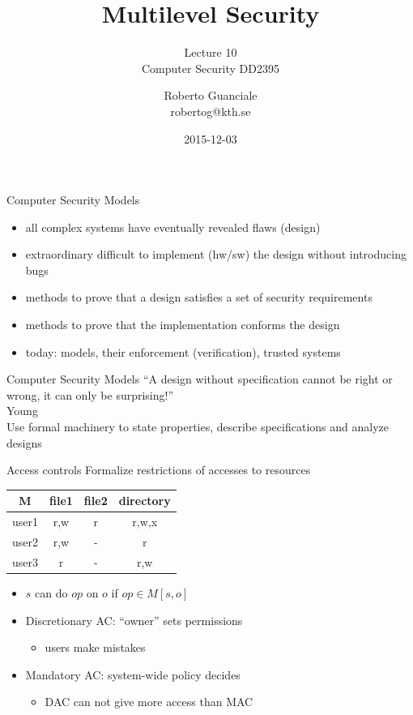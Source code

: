 \documentclass{beamer}
\title{Multilevel Security}
\subtitle{Lecture 10 \\ Computer Security DD2395}
\author[R. Guanciale]{
  Roberto Guanciale\\
  robertog@kth.se
}
\date{2015-12-03}
\begin{document}
\begin{frame}[plain]
  \titlepage
\end{frame}

\begin{frame}{Computer Security Models}
  \begin{itemize}
  \item all complex systems have eventually revealed flaws (design)
  \item extraordinary difficult to implement (hw/sw) the design
    without introducing bugs
  \item methods to prove that a design satisfies a set of security requirements
  \item methods to prove that the implementation conforms the design
  \item today: models, their enforcement (verification), trusted systems
  \end{itemize}
\end{frame}

\begin{frame}{Computer Security Models}
``A design without specification cannot be right or wrong,
  it can only be surprising!''
  \\
  Young
  \\
  Use formal machinery to state properties, describe specifications
  and analyze designs
\end{frame}


\begin{frame}{Access controls}
  Formalize restrictions of accesses to resources\\[10pt]
\begin{center}
  \begin{tabular}{|c|c|c|c|}
    \hline
    M & file1 & file2 & directory \\
    \hline
    user1 & r,w & r & r,w,x \\
    \hline
    user2 & r,w & - & r \\
    \hline
    user3 & r & - & r,w \\
    \hline
  \end{tabular}
\end{center}
  \begin{itemize}
  \item $s$ can do $op$ on $o$ if $op \in M[s,o]$
  \item Discretionary AC: ``owner'' sets permissions
    \begin{itemize}
      \item users make mistakes
    \end{itemize}
  \item<2-> Mandatory AC: system-wide policy decides
    \begin{itemize}
      \item DAC can not give more access than MAC
    \end{itemize}
  \end{itemize}
\end{frame}
\end{document}
